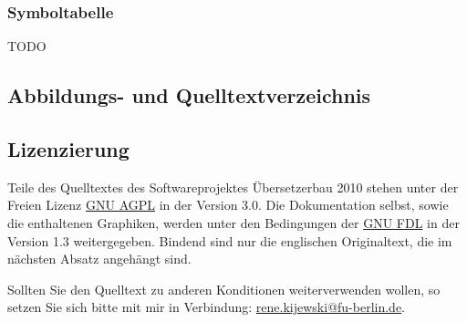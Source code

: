 \documentclass[10pt,a4paper,ngerman,titlepage,tocindentauto]{article}
\begin{document}
			\subsubsection{Symboltabelle}
				TODO
		
		\subsection{Abbildungs- und Quelltextverzeichnis}
			\listoffigures
			\lstlistoflistings
		
		\subsection{Lizenzierung}
			Teile des Quelltextes des Softwareprojektes Übersetzerbau 2010 stehen unter der Freien
			Lizenz \href{http://www.gnu.org/licenses/agpl-3.0.html}{GNU AGPL} in der Version 3.0.
			Die Dokumentation selbst, sowie die enthaltenen Graphiken, werden unter den Bedingungen
			der \href{http://www.gnu.org/licenses/fdl-1.3.html}{GNU FDL} in der Version 1.3 weitergegeben.
			Bindend sind nur die englischen Originaltext, die im nächsten Absatz angehängt sind.
			
			Sollten Sie den Quelltext zu anderen Konditionen weiterverwenden wollen, so setzen Sie
			sich bitte mit mir in Verbindung:
			\href{mailto:rene.kijewski@fu-berlin.de?subject=[SWP_CP_2010]}{rene.kijewski@fu-berlin.de}.
			
\end{document}
